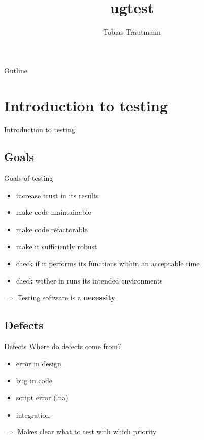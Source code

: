 \documentclass{beamer}
\title[ugtest]{ugtest}
\author{Tobias Trautmann}
\institute{GCSC}
\newcommand{\sectiontitle}[1]{
    \section{#1}
    \begin{frame}
        \centering
        \Huge{#1}
    \end{frame}
}
\begin{document}
    \begin{frame}
        \titlepage
    \end{frame}

    \begin{frame}{Outline}
        \tableofcontents
    \end{frame}


    \sectiontitle{Introduction to testing}
        \subsection{Goals}
        \begin{frame}{Goals of testing}
           \begin{itemize}
                \item increase trust in its results\pause
                \item make code maintainable\pause
                \item make code refactorable\pause
                \item make it sufficiently robust\pause
                \item check if it performs its functions within an acceptable time\pause
                \item check wether in runs its intended environments\pause
           \end{itemize}
           \Large{$\Rightarrow$ Testing software is a \textbf{necessity}}
        \end{frame}

        \subsection{Defects}
        \begin{frame}{Defects}
            Where do defects come from?\\
            \begin{itemize}
                \item error in design
                \item bug in code
                \item script error (lua)
                \item integration
            \end{itemize}
            $\Rightarrow$ Makes clear what to test with which priority

        \end{frame}
        
\end{document}
